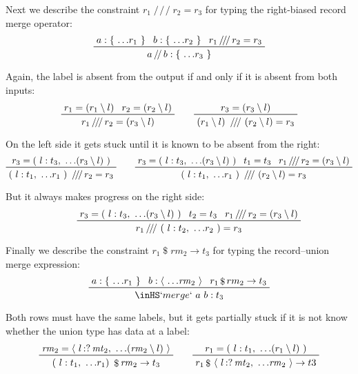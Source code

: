 \documentclass[11pt, twoside, reqno]{book}
\providecommand{\lcurvyangle}{\langle}
\providecommand{\rcurvyangle}{\rangle}
\begin{document}
Next we describe the constraint \(r_1 \mathop{/\!/\!/} r_2 = r_3\) for typing the right-biased record merge operator:
\begin{displaymath}
\prftree{a : \{\ \dots\!r_1\ \}}{b : \{\ \dots\!r_2\ \}}{r_1 \mathop{/\!/\!/} r_2 = r_3}{a \mathop{/\!/} b : \{\ \dots\!r_3\ \}}
\end{displaymath}

Again, the label is absent from the output if and only if it is absent from both inputs:
\begin{displaymath}
\prftree{r_1 = (r_1 \setminus l)}{r_2 = (r_2 \setminus l)}{r_1 \mathop{/\!/\!/} r_2 = (r_3 \setminus l)}
\qquad
\prftree{r_3 = (r_3 \setminus l)}{(r_1 \setminus l)\ \mathop{/\!/\!/}\ (r_2 \setminus l) = r_3}
\end{displaymath}

On the left side it gets stuck until it is known to be absent from the right:
\begin{displaymath}
\prftree
  {r_3 = (\ l : t_3,\ \dots\!(r_3 \setminus l)\ )}
  {(\ l : t_1,\ \dots\!r_1\ )\ \mathop{/\!/\!/} r_2 = r_3}
\qquad
\prftree
  {r_3 = (\ l : t_3,\ \dots\!(r_3 \setminus l)\ )}
  {t_1 = t_3}
  {r_1 \mathop{/\!/\!/} r_2 = (r_3 \setminus l)}
  {(\ l : t_1,\ \dots\!r_1\ )\ \mathop{/\!/\!/}\ (r_2 \setminus l) = r_3}
\end{displaymath}

But it always makes progress on the right side:
\begin{displaymath}
\qquad
\prftree
  {r_3 = (\ l : t_3,\ \dots\!(r_3 \setminus l)\ )}
  {t_2 = t_3}
  {r_1 \mathop{/\!/\!/} r_2 = (r_3 \setminus l)}
  {r_1 \mathop{/\!/\!/}\ (\ l : t_2,\ \dots\!r_2\ ) = r_3}
\end{displaymath}

Finally we describe the constraint \(r_1 \mathop{\$} rm_2 \to t_3\) for typing the record--union merge expression:
\begin{displaymath}
\prftree{a : \{\ \dots\!r_1\ \}}{b : \langle\ \dots\!\mathit{rm}_2\ \rangle}{r_1 \mathop{\$} rm_2 \to t_3}{\inHS`merge`\ a\ b : t_3}
\end{displaymath}

Both rows must have the same labels, but it gets partially stuck if it is not know whether the union type has data at a label:
\begin{displaymath}
\prftree{\mathit{rm}_2 = \lcurvyangle\ l \mathop{{:}{?}} \mathit{mt}_2,\ \dots\!(\mathit{rm}_2 \setminus l)\ \rcurvyangle}{(\ l : t_1,\ \dots\!r_1 )\ \mathop{\$} \mathit{rm}_2 \to t_3}
\qquad
\prftree{r_1 = (\ l : t_1,\ \dots\!(r_1 \setminus l)\ )}{r_1 \mathop{\$}\ \lcurvyangle\ l \mathop{{:}{?}} \mathit{mt}_2,\ \dots\!\mathit{rm}_2\ \rcurvyangle \to t3}
\end{displaymath}
\end{document}
